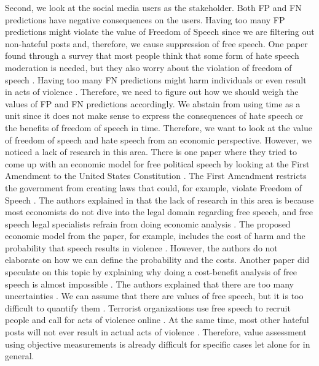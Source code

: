 Second, we look at the social media users as the stakeholder.
%
Both FP and FN predictions have negative consequences on the users.
%
Having too many FP predictions might violate the value of Freedom of Speech since we are filtering out non-hateful posts and, therefore, we cause suppression of free speech.
%
One paper found through a survey that most people think that some form of hate speech moderation is needed, but they also worry about the violation of freedom of speech \citep{olteanu2017limits}.
%
Having too many FN predictions might harm individuals or even result in acts of violence \citep{ecri-hate-speech-and-violence}.
%
Therefore, we need to figure out how we should weigh the values of FP and FN predictions accordingly.
%
We abstain from using time as a unit since it does not make sense to express the consequences of hate speech or the benefits of freedom of speech in time.
%
Therefore, we want to look at the value of freedom of speech and hate speech from an economic perspective.
%
However, we noticed a lack of research in this area.
%
There is one paper where they tried to come up with an economic model for free political speech by looking at the First Amendment to the United States Constitution \citep{posner1986free}.
%
The First Amendment restricts the government from creating laws that could, for example, violate Freedom of Speech \citep{first-amendment-white-house}.
%
The authors explained in \citet{posner1986free} that the lack of research in this area is because most economists do not dive into the legal domain regarding free speech, and free speech legal specialists refrain from doing economic analysis \citep{posner1986free}.
%
The proposed economic model from the paper, for example, includes the cost of harm and the probability that speech results in violence \citep{posner1986free}.
%
However, the authors do not elaborate on how we can define the probability and the costs. Another paper did speculate on this topic by explaining why doing a cost-benefit analysis of free speech is almost impossible \citep{sunstein2018does}.
%
The authors explained that there are too many uncertainties \citep{sunstein2018does}.
%
We can assume that there are values of free speech, but it is too difficult to quantify them \citep{sunstein2018does}.
%
Terrorist organizations use free speech to recruit people and call for acts of violence online \citep{sunstein2018does}.
%
At the same time, most other hateful posts will not ever result in actual acts of violence \citep{sunstein2018does}.
%
Therefore, value assessment using objective measurements is already difficult for specific cases let alone for in general.
